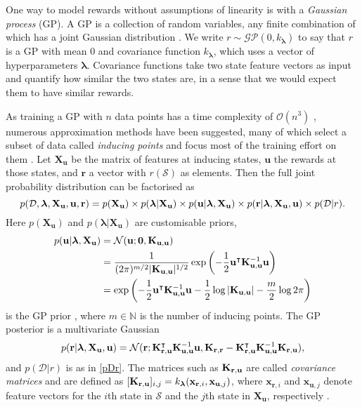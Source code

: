 \documentclass{mprop}
\theoremstyle{definition}
\begin{document}
One way to model rewards without assumptions of linearity is with a
\emph{Gaussian process} (GP). A GP is a collection of random variables, any
finite combination of which has a joint Gaussian distribution
\cite{DBLP:books/lib/RasmussenW06}. We write $r \sim \mathcal{GP}(0,
k_{\bm\lambda})$ to say that $r$ is a GP with mean $0$ and covariance function
$k_{\bm\lambda}$, which uses a vector of hyperparameters $\bm\lambda$.
Covariance functions take two state feature vectors as input and quantify how
similar the two states are, in a sense that we would expect them to have similar
rewards.

As training a GP with $n$ data points has a time complexity of
$\mathcal{O}(n^3)$ \cite{DBLP:books/lib/RasmussenW06}, numerous approximation
methods have been suggested, many of which select a subset of data called
\emph{inducing points} and focus most of the training effort on them
\cite{DBLP:journals/corr/abs-1807-01065}. Let $\mathbf{X_u}$ be the matrix of
features at inducing states, $\mathbf{u}$ the rewards at those states, and
$\mathbf{r}$ a vector with $r(\mathcal{S})$ as elements. Then the full joint
probability distribution can be factorised as
\begin{equation} \label{full}
  p(\mathcal{D}, \bm\lambda, \mathbf{X_u}, \mathbf{u}, \mathbf{r}) = p(\mathbf{X_u}) \times p(\bm\lambda | \mathbf{X_u}) \times p(\mathbf{u}
  | \bm\lambda, \mathbf{X_u}) \times p(\mathbf{r} | \bm\lambda, \mathbf{X_u},
  \mathbf{u}) \times p(\mathcal{D} | r).
\end{equation}
Here $p(\mathbf{X_u})$ and $p(\bm\lambda | \mathbf{X_u})$ are customisable priors,
\begin{align}
  p(\mathbf{u} | \bm\lambda, \mathbf{X_u}) &= \mathcal{N}(\mathbf{u}; \mathbf{0}, \mathbf{K}_{\mathbf{u},\mathbf{u}}) \nonumber \\
                                       &= \frac{1}{(2\pi)^{m/2}|\mathbf{K}_{\mathbf{u},\mathbf{u}}|^{1/2}}\exp \left( -\frac{1}{2} \mathbf{u}^\intercal\mathbf{K}_{\mathbf{u},\mathbf{u}}^{-1}\mathbf{u} \right) \nonumber \\
                                       &= \exp\left(-\frac{1}{2}\mathbf{u}^\intercal\mathbf{K}_{\mathbf{u},\mathbf{u}}^{-1}\mathbf{u} - \frac{1}{2}\log|\mathbf{K}_{\mathbf{u},\mathbf{u}}| - \frac{m}{2}\log 2\pi\right) \label{eq:normal}
\end{align}
is the GP prior \cite{DBLP:books/lib/RasmussenW06}, where $m \in \mathbb{N}$ is
the number of inducing points. The GP posterior is a
multivariate Gaussian \cite{DBLP:conf/nips/LevinePK11}
\begin{equation} \label{eq:r}
  p(\mathbf{r} | \bm\lambda, \mathbf{X_u}, \mathbf{u}) =
  \mathcal{N}(\mathbf{r}; \mathbf{K}_{\mathbf{r},\mathbf{u}}^\intercal\mathbf{K}_{\mathbf{u},\mathbf{u}}^{-1}\mathbf{u}, \mathbf{K}_{\mathbf{r},\mathbf{r}} - \mathbf{K}_{\mathbf{r},\mathbf{u}}^\intercal\mathbf{K}_{\mathbf{u},\mathbf{u}}^{-1}\mathbf{K}_{\mathbf{r},\mathbf{u}}),
\end{equation}
and $p(\mathcal{D} | r)$ is as in \eqref{pDr}. The matrices such as
$\mathbf{K}_{\mathbf{r},\mathbf{u}}$ are called \emph{covariance matrices} and are defined as
$[\mathbf{K}_{\mathbf{r},\mathbf{u}}]_{i,j} = k_{\bm\lambda}(\mathbf{x}_{\mathbf{r},i},
\mathbf{x}_{\mathbf{u},j})$, where $\mathbf{x}_{\mathbf{r},i}$ and
$\mathbf{x}_{\mathbf{u},j}$ denote feature vectors for the $i$th state in
$\mathcal{S}$ and the $j$th state in $\mathbf{X_u}$, respectively
\cite{DBLP:conf/uai/JinDAS17}.
\end{document}
